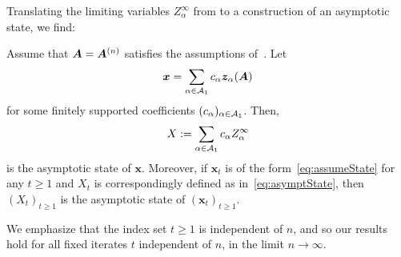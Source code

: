 Translating the limiting variables $Z_{\alpha}^{\infty}$ from  to a construction of an asymptotic state, we find:
\begin{lemma}\label{claim:cvImpliesState}
    Assume that ${\bm A} = {\bm A}^{(n)}$ satisfies the assumptions of~.
    Let 
    \begin{equation}
        \bm x = \sum_{\alpha\in {\cal A}_1} c_\alpha {\bm z}_\alpha({\bm A})\label{eq:assumeState}
    \end{equation}
    for
    some finitely supported coefficients
    $(c_\alpha)_{\alpha\in {\cal A}_1}$. Then,
    \begin{equation}
        X := \sum_{\alpha\in {\cal A}_1} c_\alpha Z^\infty_\alpha\label{eq:asymptState}
    \end{equation}
    is the asymptotic state of $\bm x$.
    Moreover, if $\bm x_t$ is of the form~\cref{eq:assumeState} for any $t\ge 1$ and $X_t$
    is correspondingly defined as in~\cref{eq:asymptState}, then $(X_t)_{t\ge 1}$ is the asymptotic
    state of $(\bm x_t)_{t\ge 1}$. 
\end{lemma}

\noindent We emphasize that the index set
$t\ge 1$ is independent of $n$, and so our
results hold for all fixed iterates $t$
independent of $n$, in the limit $n\to\infty$.

